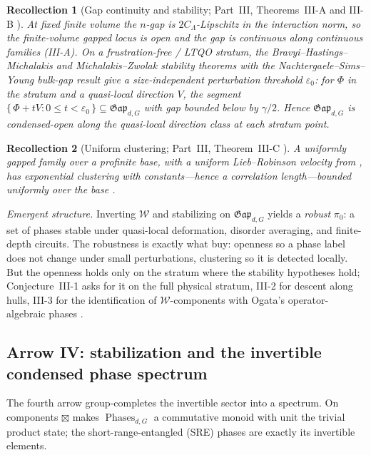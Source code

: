 \documentclass[12pt]{article}
\newcommand{\Gap}{\mathfrak{Gap}}              %
\newcommand{\Phases}{\operatorname{Phases}}    %
\newcommand{\Weq}{\mathcal{W}}                 %
\newcommand{\set}[1]{\{\,#1\,\}}
\theoremstyle{plain}
\newtheorem{recollection}[recollection]{Recollection}
\theoremstyle{definition}
\theoremstyle{remark}
\begin{document}
\begin{recollection}[Gap continuity and stability; Part~III, Theorems~III-A and III-B \cite{paperGap}]
\label{rec:III}
At fixed finite volume the $n$-gap is $2C_\Lambda$-Lipschitz in the interaction norm, so
the finite-volume gapped locus is open and the gap is continuous along continuous
families (III-A)\@. On a frustration-free / LTQO stratum, the
Bravyi--Hastings--Michalakis and Michalakis--Zwolak stability theorems with the
Nachtergaele--Sims--Young bulk-gap result \cite{bhm-stability,michalakis-zwolak,nsy-bulkgap}
give a size-independent perturbation threshold $\varepsilon_0$: for
$\Phi$ in the stratum and a quasi-local direction $V$, the segment
$\set{\Phi+tV:0\le t<\varepsilon_0}\subseteq\Gap_{d,G}$ with gap bounded below by
$\gamma/2$. Hence $\Gap_{d,G}$ is condensed-open along the quasi-local direction class at
each stratum point.
\end{recollection}

\begin{recollection}[Uniform clustering; Part~III, Theorem~III-C \cite{paperGap}]
\label{rec:IIIc}
A uniformly gapped family over a profinite base, with a uniform Lieb--Robinson velocity
from , has exponential clustering with constants---hence a correlation
length---bounded uniformly over the base \cite{hastings-koma,nachtergaele-sims-clustering}.
\end{recollection}

\emph{Emergent structure.} Inverting $\Weq$ and stabilizing on $\Gap_{d,G}$ yields a
\emph{robust} $\pi_0$: a set of phases stable under quasi-local deformation, disorder
averaging, and finite-depth circuits. The robustness is exactly what
 buy: openness so a phase label does not
change under small perturbations, clustering so it is detected locally. But
the openness holds only on the stratum where the stability hypotheses hold; Conjecture~III-1
asks for it on the full physical stratum, III-2 for descent along hulls, III-3 for the
identification of $\Weq$-components with Ogata's operator-algebraic phases
\cite{ogata-classification-review}.

\subsection[Arrow IV: stabilization and the phase spectrum]{Arrow IV: stabilization and the invertible condensed phase spectrum}
\label{sec:arrowIV}

The fourth arrow group-completes the invertible sector into a spectrum. On components
$\boxtimes$ makes $\Phases_{d,G}$ a commutative monoid with unit the trivial product
state; the short-range-entangled (SRE) phases are exactly its invertible elements.
\end{document}
